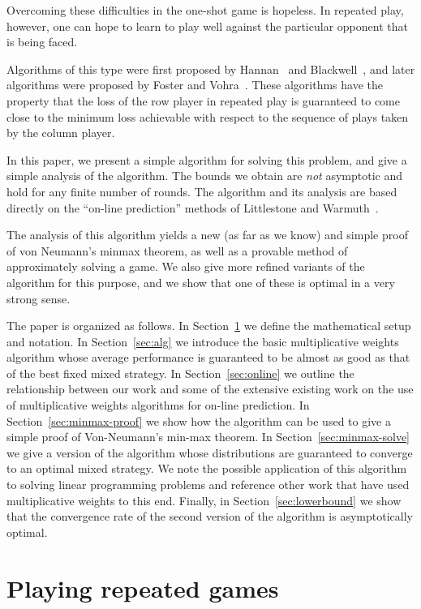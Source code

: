 Overcoming these difficulties in the one-shot game is hopeless.
In repeated play, however, one can hope to learn to play well against the
particular opponent that is being faced.

Algorithms of this type were first proposed by Hannan~\cite{Hannan57} and
Blackwell~\cite{Blackwell56}, and later algorithms were proposed by
Foster and Vohra~\cite{FosterVo93,FosterVo98,FosterVo97}.
These algorithms have the property that the loss of the row player in
repeated play is guaranteed to come close to the minimum loss achievable
with respect to the sequence of plays taken by the column player.

In this paper, we present a simple algorithm for solving this problem,
and give a simple analysis of the algorithm.
The bounds we obtain are {\em not\/} asymptotic and hold for any finite number
of rounds.
The algorithm and its analysis are 
based directly on the ``on-line prediction'' methods of Littlestone and
Warmuth~\cite{LittlestoneWa94}.

The analysis of this algorithm yields a new (as far as we know) and
simple proof of von Neumann's minmax theorem, as well as a
provable method of approximately solving a game.
We also give more refined variants of the algorithm for this purpose,
and we show that one of these is optimal in a very strong sense.

The paper is organized as follows. 
In Section~\ref{sec:prelim} we define the mathematical setup and
notation.
In Section~\ref{sec:alg}
we introduce the basic multiplicative weights algorithm whose
average performance is guaranteed to be almost as good as that of the
best fixed mixed strategy. 
In Section~\ref{sec:online} we outline the relationship between our
work and some of the extensive existing work on the use of
multiplicative weights algorithms for on-line prediction.
In Section~\ref{sec:minmax-proof} we show how the algorithm can be
used to give a simple proof of Von-Neumann's min-max theorem.
In Section~\ref{sec:minmax-solve} we give a version of the algorithm
whose distributions are guaranteed to converge to an
optimal mixed strategy. We note the possible application of this
algorithm to solving linear programming problems and reference other
work that have used multiplicative weights to this end.
Finally, in Section~\ref{sec:lowerbound} we show that the convergence rate of
the second version of the algorithm is asymptotically optimal.

\section{Playing repeated games} \label{sec:prelim}

